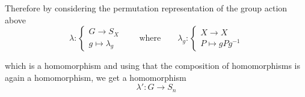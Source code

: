	Therefore by considering the permutation representation of the group action above 
	\begin{equation}
		\lambda:\begin{cases}
			G \to S_X\\
			g \mapsto \lambda_g
		\end{cases}
		\qquad
		\text{where} 
		\qquad 
		\lambda_g:\begin{cases}
			X \to X\\
			P \mapsto gPg^{-1}
		\end{cases}
	\end{equation}

	\noindent which is a homomorphism and using that the composition of homomorphisms is again a homomorphism, we get a homomorphism 
	\begin{equation}
		\lambda': G \to S_n
	\end{equation}

